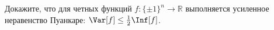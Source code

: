 Докажите, что для четных функций $f\colon \{\pm 1\}^n \to \mathbb{R}$ выполняется усиленное неравенство
Пуанкаре: $\Var[f] \le \frac{1}{2} \Inf[f]$.